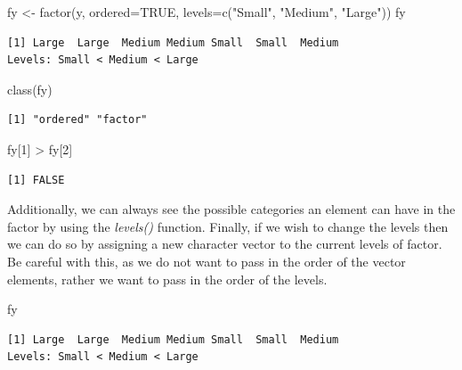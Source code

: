 \documentclass[
  letterpaper,
  DIV=11,
  numbers=noendperiod]{scrreprt}
\newenvironment{Shaded}{\begin{snugshade}}{\end{snugshade}}
\newcommand{\AttributeTok}[1]{\textcolor[rgb]{0.40,0.45,0.13}{#1}}
\newcommand{\ConstantTok}[1]{\textcolor[rgb]{0.56,0.35,0.01}{#1}}
\newcommand{\DecValTok}[1]{\textcolor[rgb]{0.68,0.00,0.00}{#1}}
\newcommand{\FunctionTok}[1]{\textcolor[rgb]{0.28,0.35,0.67}{#1}}
\newcommand{\NormalTok}[1]{\textcolor[rgb]{0.00,0.23,0.31}{#1}}
\newcommand{\OtherTok}[1]{\textcolor[rgb]{0.00,0.23,0.31}{#1}}
\newcommand{\SpecialCharTok}[1]{\textcolor[rgb]{0.37,0.37,0.37}{#1}}
\newcommand{\StringTok}[1]{\textcolor[rgb]{0.13,0.47,0.30}{#1}}
\begin{document}
\begin{Shaded}
\begin{Highlighting}[]
\NormalTok{fy }\OtherTok{\textless{}{-}} \FunctionTok{factor}\NormalTok{(y, }\AttributeTok{ordered=}\ConstantTok{TRUE}\NormalTok{, }\AttributeTok{levels=}\FunctionTok{c}\NormalTok{(}\StringTok{"Small"}\NormalTok{, }\StringTok{"Medium"}\NormalTok{, }\StringTok{"Large"}\NormalTok{))}
\NormalTok{fy}
\end{Highlighting}
\end{Shaded}

\begin{verbatim}
[1] Large  Large  Medium Medium Small  Small  Medium
Levels: Small < Medium < Large
\end{verbatim}

\begin{Shaded}
\begin{Highlighting}[]
\FunctionTok{class}\NormalTok{(fy)}
\end{Highlighting}
\end{Shaded}

\begin{verbatim}
[1] "ordered" "factor" 
\end{verbatim}

\begin{Shaded}
\begin{Highlighting}[]
\NormalTok{fy[}\DecValTok{1}\NormalTok{] }\SpecialCharTok{\textgreater{}}\NormalTok{ fy[}\DecValTok{2}\NormalTok{]}
\end{Highlighting}
\end{Shaded}

\begin{verbatim}
[1] FALSE
\end{verbatim}

Additionally, we can always see the possible categories an element can
have in the factor by using the \emph{levels()} function. Finally, if we
wish to change the levels then we can do so by assigning a new character
vector to the current levels of factor. Be careful with this, as we do
not want to pass in the order of the vector elements, rather we want to
pass in the order of the levels.

\begin{Shaded}
\begin{Highlighting}[]
\NormalTok{fy}
\end{Highlighting}
\end{Shaded}

\begin{verbatim}
[1] Large  Large  Medium Medium Small  Small  Medium
Levels: Small < Medium < Large
\end{verbatim}
\end{document}
